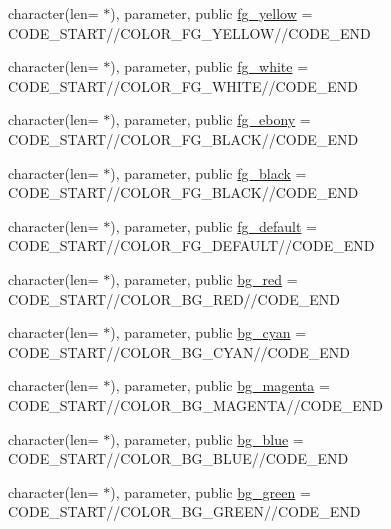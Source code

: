 \begin{DoxyCompactItemize}
\item 
character(len= $\ast$), parameter, public \mbox{\hyperlink{namespacem__escape_a9902f29abc8261843e6b317cd07368ec}{fg\+\_\+yellow}} = C\+O\+D\+E\+\_\+\+S\+T\+A\+RT//C\+O\+L\+O\+R\+\_\+\+F\+G\+\_\+\+Y\+E\+L\+L\+OW//C\+O\+D\+E\+\_\+\+E\+ND
\item 
character(len= $\ast$), parameter, public \mbox{\hyperlink{namespacem__escape_adde79fd804c7dffee08721f5a360345c}{fg\+\_\+white}} = C\+O\+D\+E\+\_\+\+S\+T\+A\+RT//C\+O\+L\+O\+R\+\_\+\+F\+G\+\_\+\+W\+H\+I\+TE//C\+O\+D\+E\+\_\+\+E\+ND
\item 
character(len= $\ast$), parameter, public \mbox{\hyperlink{namespacem__escape_a7b93e25003e389c21833a5ca8605d2de}{fg\+\_\+ebony}} = C\+O\+D\+E\+\_\+\+S\+T\+A\+RT//C\+O\+L\+O\+R\+\_\+\+F\+G\+\_\+\+B\+L\+A\+CK//C\+O\+D\+E\+\_\+\+E\+ND
\item 
character(len= $\ast$), parameter, public \mbox{\hyperlink{namespacem__escape_af2f18b52e294d4b9f312369d9e29421b}{fg\+\_\+black}} = C\+O\+D\+E\+\_\+\+S\+T\+A\+RT//C\+O\+L\+O\+R\+\_\+\+F\+G\+\_\+\+B\+L\+A\+CK//C\+O\+D\+E\+\_\+\+E\+ND
\item 
character(len= $\ast$), parameter, public \mbox{\hyperlink{namespacem__escape_a518f003512a7505cb8bf9585c103900e}{fg\+\_\+default}} = C\+O\+D\+E\+\_\+\+S\+T\+A\+RT//C\+O\+L\+O\+R\+\_\+\+F\+G\+\_\+\+D\+E\+F\+A\+U\+LT//C\+O\+D\+E\+\_\+\+E\+ND
\item 
character(len= $\ast$), parameter, public \mbox{\hyperlink{namespacem__escape_a3cd9ef6cdd5ab3dda36cc9402dff0806}{bg\+\_\+red}} = C\+O\+D\+E\+\_\+\+S\+T\+A\+RT//C\+O\+L\+O\+R\+\_\+\+B\+G\+\_\+\+R\+ED//C\+O\+D\+E\+\_\+\+E\+ND
\item 
character(len= $\ast$), parameter, public \mbox{\hyperlink{namespacem__escape_a7b7a979cd6dc44533f962d323c65a7b6}{bg\+\_\+cyan}} = C\+O\+D\+E\+\_\+\+S\+T\+A\+RT//C\+O\+L\+O\+R\+\_\+\+B\+G\+\_\+\+C\+Y\+AN//C\+O\+D\+E\+\_\+\+E\+ND
\item 
character(len= $\ast$), parameter, public \mbox{\hyperlink{namespacem__escape_aaf244507d267d0ae99ea933a8744c7e4}{bg\+\_\+magenta}} = C\+O\+D\+E\+\_\+\+S\+T\+A\+RT//C\+O\+L\+O\+R\+\_\+\+B\+G\+\_\+\+M\+A\+G\+E\+N\+TA//C\+O\+D\+E\+\_\+\+E\+ND
\item 
character(len= $\ast$), parameter, public \mbox{\hyperlink{namespacem__escape_afab2229302287eaa0eb05add07bb6621}{bg\+\_\+blue}} = C\+O\+D\+E\+\_\+\+S\+T\+A\+RT//C\+O\+L\+O\+R\+\_\+\+B\+G\+\_\+\+B\+L\+UE//C\+O\+D\+E\+\_\+\+E\+ND
\item 
character(len= $\ast$), parameter, public \mbox{\hyperlink{namespacem__escape_a5754e4af92f738d3fd7c95daeaa7f2e1}{bg\+\_\+green}} = C\+O\+D\+E\+\_\+\+S\+T\+A\+RT//C\+O\+L\+O\+R\+\_\+\+B\+G\+\_\+\+G\+R\+E\+EN//C\+O\+D\+E\+\_\+\+E\+ND

\end{DoxyCompactItemize}

